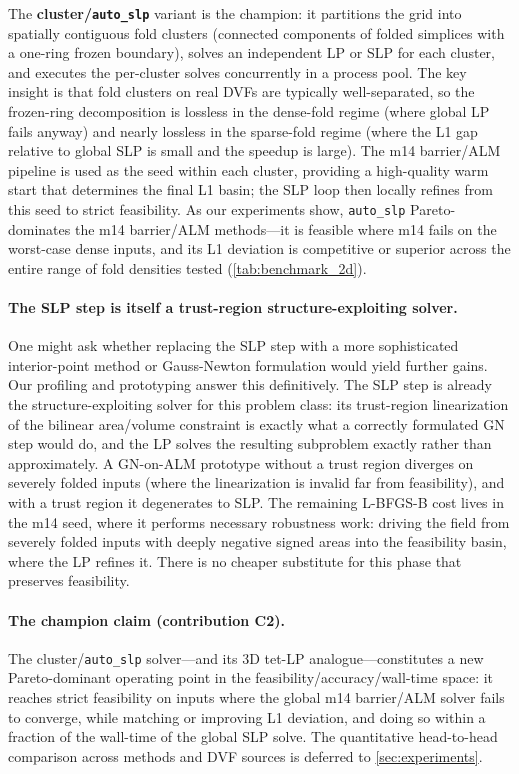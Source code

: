 \documentclass[lettersize,journal]{IEEEtran}
\begin{document}
The \textbf{cluster/\texttt{auto\_slp}} variant is the champion: it partitions the grid into spatially contiguous fold clusters (connected components of folded simplices with a one-ring frozen boundary), solves an independent LP or SLP for each cluster, and executes the per-cluster solves concurrently in a process pool. The key insight is that fold clusters on real DVFs are typically well-separated, so the frozen-ring decomposition is lossless in the dense-fold regime (where global LP fails anyway) and nearly lossless in the sparse-fold regime (where the L1 gap relative to global SLP is small and the speedup is large). The m14 barrier/ALM pipeline is used as the seed within each cluster, providing a high-quality warm start that determines the final L1 basin; the SLP loop then locally refines from this seed to strict feasibility. As our experiments show, \texttt{auto\_slp} Pareto-dominates the m14 barrier/ALM methods—it is feasible where m14 fails on the worst-case dense inputs, and its L1 deviation is competitive or superior across the entire range of fold densities tested (\autoref{tab:benchmark_2d}).

\paragraph{The SLP step is itself a trust-region structure-exploiting solver.}
One might ask whether replacing the SLP step with a more sophisticated interior-point method or Gauss-Newton formulation would yield further gains. Our profiling and prototyping answer this definitively. The SLP step is already the structure-exploiting solver for this problem class: its trust-region linearization of the bilinear area/volume constraint is exactly what a correctly formulated GN step would do, and the LP solves the resulting subproblem exactly rather than approximately. A GN-on-ALM prototype without a trust region diverges on severely folded inputs (where the linearization is invalid far from feasibility), and with a trust region it degenerates to SLP. The remaining L-BFGS-B cost lives in the m14 seed, where it performs necessary robustness work: driving the field from severely folded inputs with deeply negative signed areas into the feasibility basin, where the LP refines it. There is no cheaper substitute for this phase that preserves feasibility.

\paragraph{The champion claim (contribution C2).}
The cluster/\texttt{auto\_slp} solver—and its 3D tet-LP analogue—constitutes a new Pareto-dominant operating point in the feasibility/accuracy/wall-time space: it reaches strict feasibility on inputs where the global m14 barrier/ALM solver fails to converge, while matching or improving L1 deviation, and doing so within a fraction of the wall-time of the global SLP solve. The quantitative head-to-head comparison across methods and DVF sources is deferred to \autoref{sec:experiments}.
\end{document}
